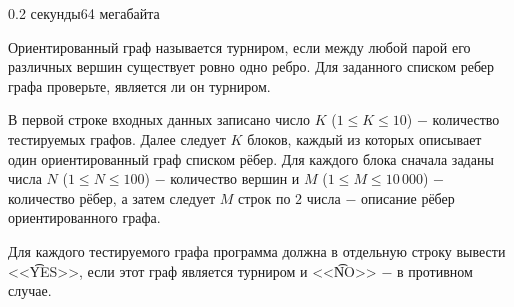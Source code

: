 \begin{problem}{}{}{}{0.2 секунды}{64 мегабайта}

Ориентированный граф называется турниром, если между любой парой его различных вершин существует ровно одно ребро. 
Для заданного списком ребер графа проверьте, является ли он турниром.

\InputFile
В первой строке входных данных записано число $K$ ($1 \le K \le 10$) $-$ количество тестируемых графов. 
Далее следует $K$ блоков, каждый из которых описывает один ориентированный граф списком рёбер. 
Для каждого блока сначала заданы числа $N$ ($1 \le N \le 100$) $-$ количество вершин и $M$ ($1 \le M \le 10\,000$) $-$
количество рёбер, а затем следует $M$ строк по $2$ числа $-$ описание рёбер ориентированного графа.

\OutputFile
Для каждого тестируемого графа программа должна в отдельную строку вывести <<{\t{YES}}>>, если этот граф
является турниром и <<{\t{NO}}>> $-$ в противном случае.


\Example

\begin{example}
%
\end{example}

\end{problem}

